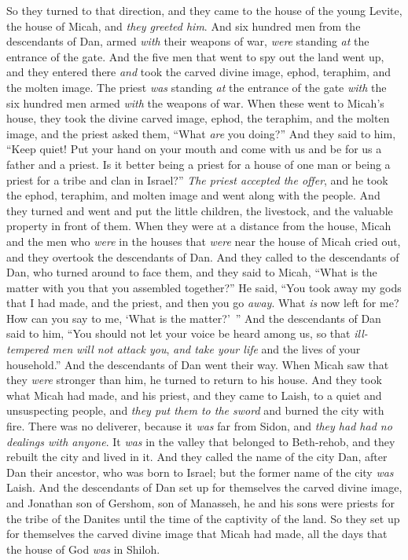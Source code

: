 \begin{biblechapter}
\verse So they turned to that direction, and they came to the house of the young Levite, the house of Micah, and \textit{they greeted him}.
\verse And six hundred men from the descendants of Dan, armed \textit{with} their weapons of war, \textit{were} standing \textit{at} the entrance of the gate.
\verse And the five men that went to spy out the land went up, and they entered there \textit{and} took the carved divine image, ephod, teraphim, and the molten image. The priest \textit{was} standing \textit{at} the entrance of the gate \textit{with} the six hundred men armed \textit{with} the weapons of war.
\verse When these went to Micah’s house, they took the divine carved image, ephod, the teraphim, and the molten image, and the priest asked them, “What \textit{are} you doing?”
\verse And they said to him, “Keep quiet! Put your hand on your mouth and come with us and be for us a father and a priest. Is it better being a priest for a house of one man or being a priest for a tribe and clan in Israel?”
\verse \textit{The priest accepted the offer}, and he took the ephod, teraphim, and molten image and went along with the people.
\verse And they turned and went and put the little children, the livestock, and the valuable property in front of them.
\verse When they were at a distance from the house, Micah and the men who \textit{were} in the houses that \textit{were} near the house of Micah cried out, and they overtook the descendants of Dan.
\verse And they called to the descendants of Dan, who turned around to face them, and they said to Micah, “What is the matter with you that you assembled together?”
\verse He said, “You took away my gods that I had made, and the priest, and then you go \textit{away}. What \textit{is} now left for me? How can you say to me, ‘What is the matter?’ ”
\verse And the descendants of Dan said to him, “You should not let your voice be heard among us, so that \textit{ill-tempered men} \textit{will not attack you}, \textit{and take your life} and the lives of your household.”
\verse And the descendants of Dan went their way. When Micah saw that they \textit{were} stronger than him, he turned to return to his house.
\verse And they took what Micah had made, and his priest, and they came to Laish, to a quiet and unsuspecting people, and \textit{they put them to the sword} and burned the city with fire.
\verse There was no deliverer, because it \textit{was} far from Sidon, and \textit{they had had no dealings with anyone}. It \textit{was} in the valley that belonged to Beth-rehob, and they rebuilt the city and lived in it.
\verse And they called the name of the city Dan, after Dan their ancestor, who was born to Israel; but the former name of the city \textit{was} Laish.
\verse And the descendants of Dan set up for themselves the carved divine image, and Jonathan son of Gershom, son of Manasseh, he and his sons were priests for the tribe of the Danites until the time of the captivity of the land.
\verse So they set up for themselves the carved divine image that Micah had made, all the days that the house of God \textit{was} in Shiloh.
\end{biblechapter}

